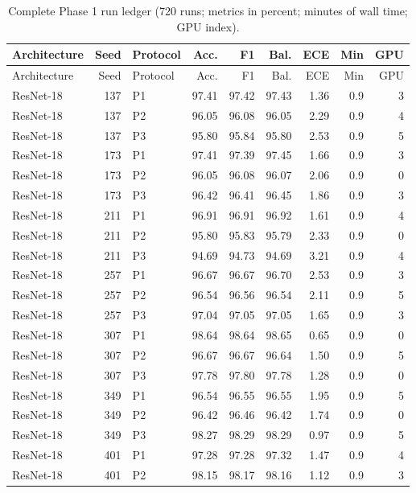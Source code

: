 {\scriptsize
\setlength{\tabcolsep}{3.5pt}
\begin{longtable}{lrlrrrrrr}
\caption{Complete Phase 1 run ledger (720 runs; metrics in percent; minutes of wall time; GPU index).}\label{r:tab:ledger-phase1}\\
\toprule
Architecture & Seed & Protocol & Acc. & F1 & Bal. & ECE & Min & GPU \\
\midrule
\endfirsthead
\toprule
Architecture & Seed & Protocol & Acc. & F1 & Bal. & ECE & Min & GPU \\
\midrule
\endhead
\bottomrule
\endfoot
ResNet-18 & 137 & P1 & 97.41 & 97.42 & 97.43 & 1.36 & 0.9 & 3 \\
ResNet-18 & 137 & P2 & 96.05 & 96.08 & 96.05 & 2.29 & 0.9 & 4 \\
ResNet-18 & 137 & P3 & 95.80 & 95.84 & 95.80 & 2.53 & 0.9 & 5 \\
ResNet-18 & 173 & P1 & 97.41 & 97.39 & 97.45 & 1.66 & 0.9 & 3 \\
ResNet-18 & 173 & P2 & 96.05 & 96.08 & 96.07 & 2.06 & 0.9 & 0 \\
ResNet-18 & 173 & P3 & 96.42 & 96.41 & 96.45 & 1.86 & 0.9 & 3 \\
ResNet-18 & 211 & P1 & 96.91 & 96.91 & 96.92 & 1.61 & 0.9 & 4 \\
ResNet-18 & 211 & P2 & 95.80 & 95.83 & 95.79 & 2.33 & 0.9 & 0 \\
ResNet-18 & 211 & P3 & 94.69 & 94.73 & 94.69 & 3.21 & 0.9 & 4 \\
ResNet-18 & 257 & P1 & 96.67 & 96.67 & 96.70 & 2.53 & 0.9 & 3 \\
ResNet-18 & 257 & P2 & 96.54 & 96.56 & 96.54 & 2.11 & 0.9 & 5 \\
ResNet-18 & 257 & P3 & 97.04 & 97.05 & 97.05 & 1.65 & 0.9 & 3 \\
ResNet-18 & 307 & P1 & 98.64 & 98.64 & 98.65 & 0.65 & 0.9 & 0 \\
ResNet-18 & 307 & P2 & 96.67 & 96.67 & 96.64 & 1.50 & 0.9 & 5 \\
ResNet-18 & 307 & P3 & 97.78 & 97.80 & 97.78 & 1.28 & 0.9 & 0 \\
ResNet-18 & 349 & P1 & 96.54 & 96.55 & 96.55 & 1.95 & 0.9 & 5 \\
ResNet-18 & 349 & P2 & 96.42 & 96.46 & 96.42 & 1.74 & 0.9 & 0 \\
ResNet-18 & 349 & P3 & 98.27 & 98.29 & 98.29 & 0.97 & 0.9 & 5 \\
ResNet-18 & 401 & P1 & 97.28 & 97.28 & 97.32 & 1.47 & 0.9 & 4 \\
ResNet-18 & 401 & P2 & 98.15 & 98.17 & 98.16 & 1.12 & 0.9 & 3 \\

\end{longtable}}
